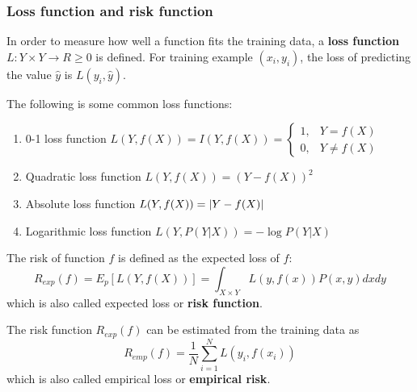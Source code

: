 \subsubsection{Loss function and risk function}

\begin{definition}
In order to measure how well a function fits the training data, a \textbf{loss function} $L:Y \times Y \rightarrow R \geq 0$ is defined. For training example $(x_i,y_i)$, the loss of predicting the value $\widehat{y}$ is $L(y_i,\widehat{y})$.
\end{definition}

The following is some common loss functions:
\begin{enumerate}
\item 0-1 loss function $L(Y,f(X))=I(Y,f(X))=\begin{cases} 1, & Y=f(X) \\ 0, & Y \neq f(X) \end{cases}$
\item Quadratic loss function $L(Y,f(X))=\left(Y-f(X)\right)^2$
\item Absolute loss function $L(Y,f(X))=\left\lvert Y-f(X)\right\rvert$
\item Logarithmic loss function $L(Y,P(Y|X))=-\log{P(Y|X)}$
\end{enumerate}

\begin{definition}
The risk of function $f$ is defined as the expected loss of $f$:
\begin{equation}
R_{exp}(f)=E_p\left[L\left(Y,f(X)\right)\right]=\int _{X \times Y} L\left(y,f(x)\right)P(x,y)dxdy
\end{equation}
which is also called expected loss or \textbf{risk function}.
\end{definition}

\begin{definition}
The risk function $R_{exp}(f)$ can be estimated from the training data as
\begin{equation}
R_{emp}(f)=\dfrac{1}{N}\sum\limits_{i=1}^{N} L\left(y_i,f(x_i)\right)
\end{equation}
which is also called empirical loss or \textbf{empirical risk}.
\end{definition}

